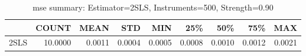 \begin{table}[ht]
\centering
\caption{mse summary: Estimator=2SLS, Instruments=500, Strength=0.90}
\begin{tabular}{lrrrrrrrr}
\toprule
 & COUNT & MEAN & STD & MIN & 25\% & 50\% & 75\% & MAX \\
\midrule
2SLS & 10.0000 & 0.0011 & 0.0004 & 0.0005 & 0.0008 & 0.0010 & 0.0012 & 0.0021 \\
\bottomrule
\end{tabular}
\end{table}
